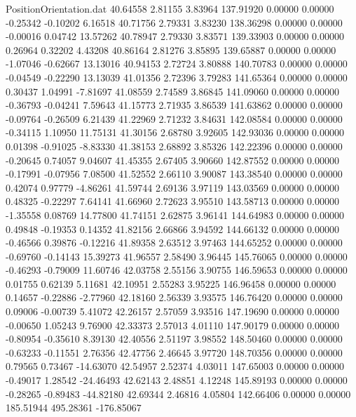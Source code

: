 \begin{filecontents}{PositionOrientation.dat}
  40.64558    2.81155    3.83964   137.91920    0.00000    0.00000   -0.25342   -0.10202    6.16518
  40.71756    2.79331    3.83230   138.36298    0.00000    0.00000   -0.00016    0.04742   13.57262
  40.78947    2.79330    3.83571   139.33903    0.00000    0.00000    0.26964    0.32202    4.43208
  40.86164    2.81276    3.85895   139.65887    0.00000    0.00000   -1.07046   -0.62667   13.13016
  40.94153    2.72724    3.80888   140.70783    0.00000    0.00000   -0.04549   -0.22290   13.13039
  41.01356    2.72396    3.79283   141.65364    0.00000    0.00000    0.30437    1.04991   -7.81697
  41.08559    2.74589    3.86845   141.09060    0.00000    0.00000   -0.36793   -0.04241    7.59643
  41.15773    2.71935    3.86539   141.63862    0.00000    0.00000   -0.09764   -0.26509    6.21439
  41.22969    2.71232    3.84631   142.08584    0.00000    0.00000   -0.34115    1.10950   11.75131
  41.30156    2.68780    3.92605   142.93036    0.00000    0.00000    0.01398   -0.91025   -8.83330
  41.38153    2.68892    3.85326   142.22396    0.00000    0.00000   -0.20645    0.74057    9.04607
  41.45355    2.67405    3.90660   142.87552    0.00000    0.00000   -0.17991   -0.07956    7.08500
  41.52552    2.66110    3.90087   143.38540    0.00000    0.00000    0.42074    0.97779   -4.86261
  41.59744    2.69136    3.97119   143.03569    0.00000    0.00000    0.48325   -0.22297    7.64141
  41.66960    2.72623    3.95510   143.58713    0.00000    0.00000   -1.35558    0.08769   14.77800
  41.74151    2.62875    3.96141   144.64983    0.00000    0.00000    0.49848   -0.19353    0.14352
  41.82156    2.66866    3.94592   144.66132    0.00000    0.00000   -0.46566    0.39876   -0.12216
  41.89358    2.63512    3.97463   144.65252    0.00000    0.00000   -0.69760   -0.14143   15.39273
  41.96557    2.58490    3.96445   145.76065    0.00000    0.00000   -0.46293   -0.79009   11.60746
  42.03758    2.55156    3.90755   146.59653    0.00000    0.00000    0.01755    0.62139    5.11681
  42.10951    2.55283    3.95225   146.96458    0.00000    0.00000    0.14657   -0.22886   -2.77960
  42.18160    2.56339    3.93575   146.76420    0.00000    0.00000    0.09006   -0.00739    5.41072
  42.26157    2.57059    3.93516   147.19690    0.00000    0.00000   -0.00650    1.05243    9.76900
  42.33373    2.57013    4.01110   147.90179    0.00000    0.00000   -0.80954   -0.35610    8.39130
  42.40556    2.51197    3.98552   148.50460    0.00000    0.00000   -0.63233   -0.11551    2.76356
  42.47756    2.46645    3.97720   148.70356    0.00000    0.00000    0.79565    0.73467  -14.63070
  42.54957    2.52374    4.03011   147.65003    0.00000    0.00000   -0.49017    1.28542  -24.46493
  42.62143    2.48851    4.12248   145.89193    0.00000    0.00000   -0.28265   -0.89483  -44.82180
  42.69344    2.46816    4.05804   142.66406    0.00000    0.00000  185.51944  495.28361 -176.85067
\end{filecontents}
